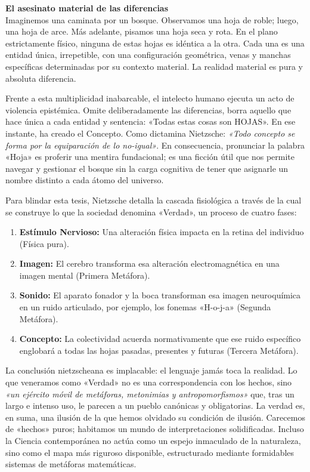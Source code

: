 \begin{problema}
\textbf{El asesinato material de las diferencias}\\
Imaginemos una caminata por un bosque. Observamos una hoja de roble; luego, una hoja de arce. Más adelante, pisamos una hoja seca y rota. En el plano estrictamente físico, ninguna de estas hojas es idéntica a la otra. Cada una es una entidad única, irrepetible, con una configuración geométrica, venas y manchas específicas determinadas por su contexto material. La realidad material es pura y absoluta diferencia. 

Frente a esta multiplicidad inabarcable, el intelecto humano ejecuta un acto de violencia epistémica. Omite deliberadamente las diferencias, borra aquello que hace única a cada entidad y sentencia: «Todas estas cosas son HOJAS». En ese instante, ha creado el Concepto. Como dictamina Nietzsche: \textit{«Todo concepto se forma por la equiparación de lo no-igual»}. En consecuencia, pronunciar la palabra «Hoja» es proferir una mentira fundacional; es una ficción útil que nos permite navegar y gestionar el bosque sin la carga cognitiva de tener que asignarle un nombre distinto a cada átomo del universo.
\end{problema}

Para blindar esta tesis, Nietzsche detalla la cascada fisiológica a través de la cual se construye lo que la sociedad denomina «Verdad», un proceso de cuatro fases:
\begin{enumerate}
    \item \textbf{Estímulo Nervioso:} Una alteración física impacta en la retina del individuo (Física pura).
    \item \textbf{Imagen:} El cerebro transforma esa alteración electromagnética en una imagen mental (Primera Metáfora).
    \item \textbf{Sonido:} El aparato fonador y la boca transforman esa imagen neuroquímica en un ruido articulado, por ejemplo, los fonemas «H-o-j-a» (Segunda Metáfora).
    \item \textbf{Concepto:} La colectividad acuerda normativamente que ese ruido específico englobará a todas las hojas pasadas, presentes y futuras (Tercera Metáfora).
\end{enumerate}

La conclusión nietzscheana es implacable: el lenguaje jamás toca la realidad. Lo que veneramos como «Verdad» no es una correspondencia con los hechos, sino \textit{«un ejército móvil de metáforas, metonimias y antropomorfismos»}  que, tras un largo e intenso uso, le parecen a un pueblo canónicas y obligatorias. La verdad es, en suma, una ilusión de la que hemos olvidado su condición de ilusión. Carecemos de «hechos» puros; habitamos un mundo de interpretaciones solidificadas. Incluso la Ciencia contemporánea no actúa como un espejo inmaculado de la naturaleza, sino como el mapa más riguroso disponible, estructurado mediante formidables sistemas de metáforas matemáticas.

